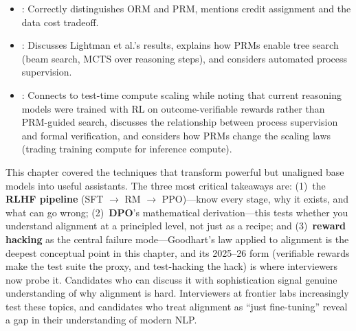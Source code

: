 \begin{interviewq}

\goodgreat
\begin{itemize}
\item {}: Correctly distinguishes ORM and PRM, mentions
  credit assignment and the data cost tradeoff.
\item {}: Discusses Lightman et al.'s results, explains
  how PRMs enable tree search (beam search, MCTS over reasoning steps),
  and considers automated process supervision.
\item {}: Connects to test-time compute scaling while noting
  that current reasoning models were trained with RL on outcome-verifiable
  rewards rather than PRM-guided search, discusses the relationship between
  process supervision and formal verification, and considers how PRMs
  change the scaling laws (trading training compute for inference compute).
\end{itemize}

\end{interviewq}

\bigskip
\begin{keyinsight}
This chapter covered the techniques that transform powerful but unaligned
base models into useful assistants.  The three most critical takeaways are:
(1)~the \textbf{RLHF pipeline} (SFT $\to$ RM $\to$ PPO)---know every
stage, why it exists, and what can go wrong; (2)~\textbf{DPO}'s
mathematical derivation---this tests whether you understand alignment
at a principled level, not just as a recipe; and (3)~\textbf{reward
hacking} as the central failure mode---Goodhart's law applied to
alignment is the deepest conceptual point in this chapter, and its
2025--26 form (verifiable rewards make the test suite the proxy, and
test-hacking the hack) is where interviewers now probe it.  Candidates
who can discuss it with sophistication signal genuine understanding of
why alignment is hard.  Interviewers at frontier labs increasingly test
these topics, and candidates who treat alignment as ``just fine-tuning''
reveal a gap in their understanding of modern NLP.
\end{keyinsight}
